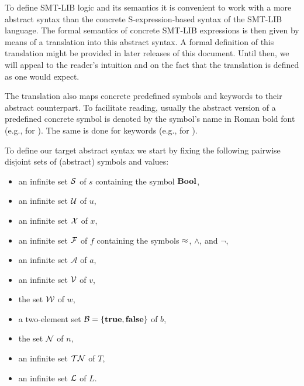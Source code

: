 To define SMT-LIB logic and its semantics it is convenient to work 
with a more abstract syntax than the concrete S-expression-based syntax 
of the SMT-LIB language.
The formal semantics of concrete SMT-LIB expressions is then given by means 
of a translation into this abstract syntax.
A formal definition of this translation might be provided in later releases 
of this document.
Until then, we will appeal to the reader's intuition and on the fact that 
the translation is defined as one would expect.

The translation also maps concrete predefined symbols and keywords
to their abstract counterpart.
To facilitate reading, usually the abstract version of 
a predefined concrete symbol is denoted by the symbol's name 
in Roman bold font (e.g.,  for ).
The same is done for keywords (e.g.,  for ).

To define our target abstract syntax we start by fixing the following pairwise disjoint
sets of (abstract) symbols and values:
\begin{itemize}
\item
an infinite set $\mathcal{S}$ of  $s$ 
containing the symbol $\textbf{Bool}$,

\item
an infinite set $\mathcal{U}$ of  $u$,

\item
an infinite set $\mathcal{X}$ of  $x$,

\item
an infinite set $\mathcal{F}$ of  $f$
containing the symbols $\approx$, $\land$, and $\lnot$,

\item
an infinite set $\mathcal{A}$ of  $a$, 

\item
an infinite set $\mathcal{V}$ of  $v$,

\item
the set $\mathcal{W}$ of  $w$,

\item
a two-element set $\mathcal{B} = \{\textbf{true}, \textbf{false}\}$ of  $b$,

\item
the set $\mathcal{N}$ of  $n$,

\item
an infinite set $\mathcal{TN}$ of  $T$,

\item
an infinite set $\mathcal{L}$ of  $L$.


\end{itemize}


